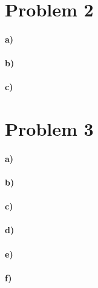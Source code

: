 \documentclass[12pt]{article}
\begin{document}
\section*{Problem 2}

\paragraph{a)}

\paragraph{b)}

\paragraph{c)}

\section*{Problem 3}

\paragraph{a)}

\paragraph{b)}

\paragraph{c)}

\paragraph{d)}

\paragraph{e)}

\paragraph{f)}
\end{document}
